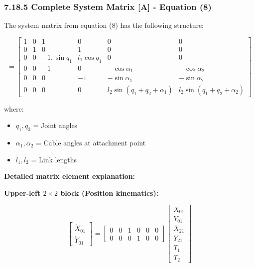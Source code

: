 \subsubsection{7.18.5 Complete System Matrix [A] - Equation (8)}

The system matrix from equation (8) has the following structure:

\begin{equation}
[A] = \begin{bmatrix}
1 & 0 & 1 & 0 & 0 & 0 \\
0 & 1 & 0 & 1 & 0 & 0 \\
0 & 0 & -1, \sin q_1 & l_1 \cos q_1 & 0 & 0 \\
0 & 0 & -1 & 0 & -\cos \alpha_1 & -\cos \alpha_2 \\
0 & 0 & 0 & -1 & -\sin \alpha_1 & -\sin \alpha_2 \\
0 & 0 & 0 & 0 & l_2 \sin(q_1 + q_2 + \alpha_1) & l_2 \sin(q_1 + q_2 + \alpha_2)
\end{bmatrix}
\end{equation}

where:
\begin{itemize}
    \item $q_1, q_2$ = Joint angles
    \item $\alpha_1, \alpha_2$ = Cable angles at attachment point
    \item $l_1, l_2$ = Link lengths
\end{itemize}

\textbf{Detailed matrix element explanation:}

\textbf{Upper-left $2 \times 2$ block (Position kinematics):}

\begin{equation}
\begin{bmatrix}
\dot{X}_{01} \\
\dot{Y}_{01}
\end{bmatrix} = \begin{bmatrix}
0 & 0 & 1 & 0 & 0 & 0 \\
0 & 0 & 0 & 1 & 0 & 0
\end{bmatrix} \begin{bmatrix}
X_{01} \\
Y_{01} \\
X_{21} \\
Y_{21} \\
T_1 \\
T_2
\end{bmatrix}
\end{equation}

